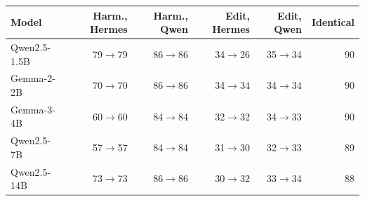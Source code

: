 \begin{tabular}{@{}lrrrrr@{}}
\toprule
Model & Harm., Hermes & Harm., Qwen & Edit, Hermes & Edit, Qwen & Identical \\
\midrule
Qwen2.5-1.5B & 79$\to$79 & 86$\to$86 & 34$\to$26 & 35$\to$34 & 90 \\
Gemma-2-2B & 70$\to$70 & 86$\to$86 & 34$\to$34 & 34$\to$34 & 90 \\
Gemma-3-4B & 60$\to$60 & 84$\to$84 & 32$\to$32 & 34$\to$33 & 90 \\
Qwen2.5-7B & 57$\to$57 & 84$\to$84 & 31$\to$30 & 32$\to$33 & 89 \\
Qwen2.5-14B & 73$\to$73 & 86$\to$86 & 30$\to$32 & 33$\to$34 & 88 \\
\bottomrule
\end{tabular}
